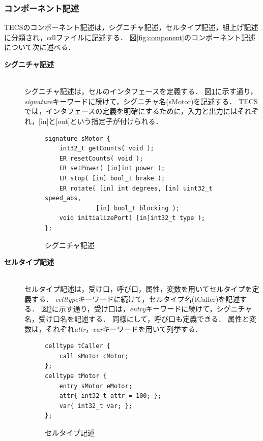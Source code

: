 \documentclass[submit]{ipsj_v2/UTF8/ipsj}
\begin{document}
\subsubsection{コンポーネント記述}
TECSのコンポーネント記述は，シグニチャ記述，セルタイプ記述，組上げ記述に分類され，cdlファイルに記述する．
図\ref{fig:component}のコンポーネント記述について次に述べる．

\begin{description}
    \item[{\bf シグニチャ記述}]\mbox{}\\
        シグニチャ記述は，セルのインタフェースを定義する．
        図\ref{signature}に示す通り，{\it signature}キーワードに続けて，シグニチャ名(sMotor)を記述する．
        TECSでは，インタフェースの定義を明確にするために，入力と出力にはそれぞれ，[in]と[out]という指定子が付けられる．
        
\begin{figure}[t]
\centering
\begin{lstlisting}
signature sMotor {
    int32_t getCounts( void );
    ER resetCounts( void );
    ER setPower( [in]int power );
    ER stop( [in] bool_t brake );
    ER rotate( [in] int degrees, [in] uint32_t speed_abs,
              [in] bool_t blocking );
    void initializePort( [in]int32_t type );
};
\end{lstlisting}
\caption{シグニチャ記述}
\label{signature}
\end{figure}

    \item[{\bf セルタイプ記述}]\mbox{}\\
        セルタイプ記述は，受け口，呼び口，属性，変数を用いてセルタイプを定義する．
        {\it celltype}キーワードに続けて，セルタイプ名(tCaller)を記述する．
        図\ref{celltype}に示す通り，受け口は，{\it entry}キーワードに続けて，シグニチャ名，受け口名を記述する．
        同様にして，呼び口も定義できる．
        属性と変数は，それぞれ{\it attr}，{\it var}キーワードを用いて列挙する．

\begin{figure}[t]
\centering
\begin{lstlisting}
celltype tCaller {
    call sMotor cMotor;
};
celltype tMotor {
    entry sMotor eMotor;
    attr{ int32_t attr = 100; };
    var{ int32_t var; };
};
\end{lstlisting}
\caption{セルタイプ記述}  
\label{celltype}
\end{figure}


\end{description}
\end{document}
